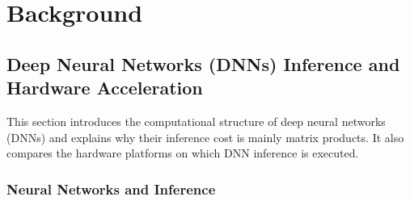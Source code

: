 \chapter{Background}

\section{Deep Neural Networks (DNNs) Inference and Hardware Acceleration}
\label{sec:dnn_inference}

This section introduces the computational structure of deep neural networks (DNNs) and explains why their inference cost is mainly matrix products. It also compares the hardware platforms on which DNN inference is executed.

\subsection{Neural Networks and Inference}
\label{subsec:nn_inference}






